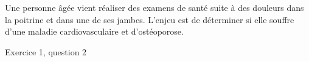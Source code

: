 \newpage
\vAligne{-80pt}

Une personne âgée vient réaliser des examens de santé suite à des douleurs dans la poitrine et dans une de ses jambes.
L'enjeu est de déterminer si elle souffre d'une maladie cardiovasculaire et d'ostéoporose.

\bigskip


\newpage


\vspace*{36pt}
\boiteAnnexe

Exercice 1, question 2

\begin{center}
\end{center}